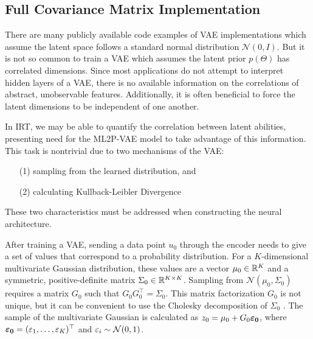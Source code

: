 \subsection{Full Covariance Matrix Implementation}\label{sec:cov}
There are many publicly available code examples of VAE implementations which assume the latent space follows a standard normal distribution $\mathcal{N}(0,I)$. But it is not so common to train a VAE which assumes the latent prior $p(\Theta)$ has correlated dimensions. Since most applications do not attempt to interpret hidden layers of a VAE, there is no available information on the correlations of abstract, unobservable features. Additionally, it is often beneficial to force the latent dimensions to be independent of one another.

In IRT, we may be able to quantify the correlation between latent abilities, presenting need for the ML2P-VAE model to take advantage of this information. This task is nontrivial due to two mechanisms of the VAE:
\begin{itemize}
  \item[(1)] sampling from the learned distribution, and
  \item[(2)] calculating Kullback-Leibler Divergence
\end{itemize}
These two characteristics must be addressed when constructing the neural architecture.

After training a VAE, sending a data point $u_0$ through the encoder needs to give a set of values that correspond to a probability distribution. For a $K$-dimensional multivariate Gaussian distribution, these values are a vector $\mu_0 \in \mathbb{R}^K$ and a symmetric, positive-definite matrix $\Sigma_0 \in \mathbb{R}^{K\times K}$. Sampling from $\mathcal{N}(\mu_0, \Sigma_0)$ requires a matrix $G_0$ such that $G_0 G_0^\top = \Sigma_0$. This matrix factorization $G_0$ is not unique, but it can be convenient to use the Cholesky decomposition of $\Sigma_0$ \cite{atkinson}. The sample of the multivariate Gaussian is calculated as $z_0 = \mu_0 + G_0 \boldsymbol{\varepsilon_0}$, where $\boldsymbol{\varepsilon_0} = (\varepsilon_1, \ldots, \varepsilon_K)^\top$ and $\varepsilon_i \sim \mathcal{N}(0,1)$. 

